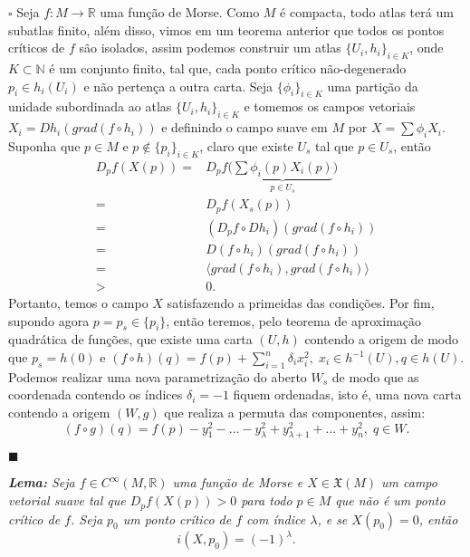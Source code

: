 \documentclass{article}
\begin{document}
	$\square$ Seja $f : M \to \mathbb{R}$ uma função de Morse. Como $M$ é compacta, todo atlas terá um subatlas finito, além disso, vimos em um teorema anterior que todos os pontos críticos de $f$ são isolados, assim podemos construir um atlas $\{U_{i}, h_{i}\}_{i \in K}$, onde $K \subset \mathbb{N}$ é um conjunto finito, tal que, cada ponto crítico não-degenerado $p_{i} \in h_{i}(U_{i})$ e não pertença a outra carta. Seja $\{\phi_{i}\}_{i \in K}$ uma partição da unidade subordinada ao atlas $\{U_{i}, h_{i}\}_{i \in K}$ e tomemos os campos vetoriais $X_{i} = Dh_{i}(grad(f \circ h_{i}))$ e definindo o campo suave em $M$ por $X = \sum \phi_{i} X_{i}$. Suponha que $p \in M$ e $p \notin \{p_{i}\}_{i \in K}$, claro que existe $U_{s}$ tal que $p \in U_{s}$, então 
	$$
	\begin{aligned}
	D_{p}f(X(p)) =& D_{p}f \Big(\underbrace{ \sum \phi_{i}(p) X_{i}(p) }_{p \in U_{s}}\Big) 
	\\
	=& D_{p}f(X_{s}(p)) 
	\\
	=& (D_{p}f \circ Dh_{i})(grad(f \circ h_{i}))
	\\
	=& D(f \circ h_{i})(grad(f \circ h_{i})) 
	\\
	=& \langle grad(f \circ h_{i}), grad(f \circ h_{i}) \rangle 
	\\
	>&0.
	\end{aligned}
	$$
	Portanto, temos o campo $X$ satisfazendo a primeidas das condições. Por fim, supondo agora $p = p_{s} \in \{p_{i}\}$, então teremos, pelo teorema de aproximação quadrática de funções, que existe uma carta $(U, h)$ contendo a origem de modo que $p_{s} = h(0)$ e $(f \circ h) (q) = f(p) + \sum_{i=1}^{n}\delta_{i}x_{i}^{2}, \; x_{i} \in h^{-1}(U), q \in h(U)$. Podemos realizar uma nova parametrização do aberto $W_{s}$ de modo que as coordenada contendo os índices $\delta_{i} = -1$ fiquem ordenadas, isto é, uma nova carta contendo a origem $(W, g)$ que realiza a permuta das componentes, assim:
	$$
	(f \circ g) (q) = f(p) - y_{1}^{2} - \dots - y_{\lambda}^{2} + y_{\lambda+1}^{2} + \dots + y_{n}^{2}, \; q \in W.
	$$
	
	$\blacksquare$
	
	\vspace{2mm}
	\textit{\textbf{Lema:} Seja $f \in C^{\infty}(M, \mathbb{R})$ uma função de Morse e $X \in \mathfrak{X}(M)$ um campo vetorial suave tal que $D_{p}f(X(p)) > 0$ para todo $p \in M$ que não é um ponto crítico de $f$. Seja $p_{0}$ um ponto crítico de $f$ com índice $\lambda$, e se $X(p_{0}) = 0$, então}
	$$
	i(X, p_{0}) = (-1)^{\lambda}.
	$$
	
\end{document}
